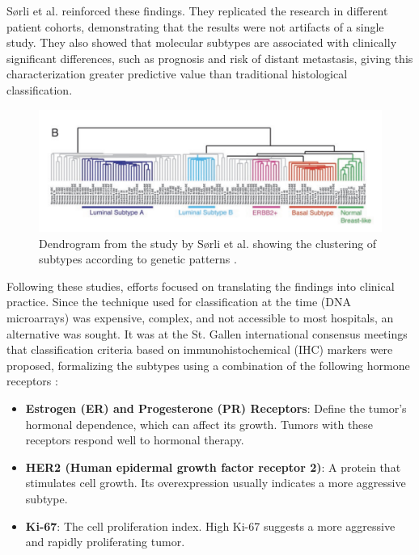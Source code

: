 \documentclass[a4paper,10pt]{book}
\begin{document}
Sørli et al. reinforced these findings. They replicated the research in different patient cohorts, demonstrating that the results were not artifacts of a single study. They also showed that molecular subtypes are associated with clinically significant differences, such as prognosis and risk of distant metastasis, giving this characterization greater predictive value than traditional histological classification.

\begin{figure}
	\centering
	\includegraphics[width=0.8\linewidth]{reports//assets/dendogram.png}
	\caption[Molecular subtypes dendrogram by Sørli et al.]{Dendrogram from the study by Sørli et al. showing the clustering of subtypes according to genetic patterns \cite{sorlie_repeated_2003}.}
	\label{fig:sorlie-dandrogram}
\end{figure}

Following these studies, efforts focused on translating the findings into clinical practice. Since the technique used for classification at the time (DNA microarrays) was expensive, complex, and not accessible to most hospitals, an alternative was sought. It was at the St. Gallen international consensus meetings that classification criteria based on immunohistochemical (IHC) markers were proposed, formalizing the subtypes using a combination of the following hormone receptors \cite{lips_breast_2013}:

\begin{itemize}
	\item \textbf{Estrogen (ER) and Progesterone (PR) Receptors}: Define the tumor’s hormonal dependence, which can affect its growth. Tumors with these receptors respond well to hormonal therapy.
	\item \textbf{HER2 (Human epidermal growth factor receptor 2)}: A protein that stimulates cell growth. Its overexpression usually indicates a more aggressive subtype.
	\item \textbf{Ki-67}: The cell proliferation index. High Ki-67 suggests a more aggressive and rapidly proliferating tumor.
\end{itemize}
\end{document}
